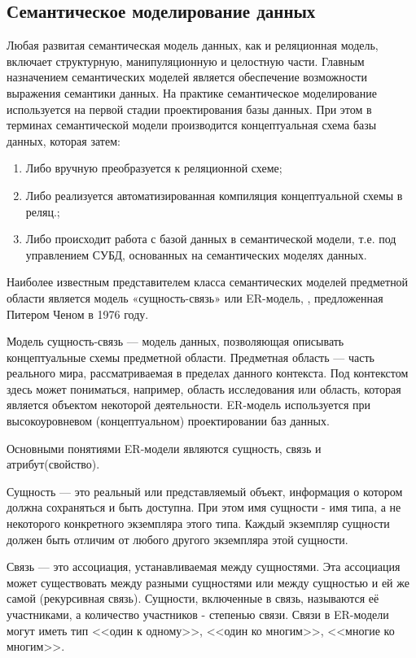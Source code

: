 \newpage

\subsection{Семантическое моделирование данных}

Любая развитая семантическая модель данных, как и реляционная модель, включает структурную, манипуляционную и целостную части. Главным назначением семантических моделей является обеспечение возможности выражения семантики данных. На практике семантическое моделирование используется на первой стадии проектирования базы данных. При этом в терминах семантической модели производится концептуальная схема базы данных, которая затем:
\begin{enumerate}
	\item Либо вручную преобразуется к реляционной схеме;
	\item Либо реализуется автоматизированная компиляция концептуальной схемы в реляц.;
	\item Либо происходит работа с базой данных в семантической модели, т.е. под управлением СУБД, основанных на семантических моделях данных. 
\end{enumerate}

Наиболее известным представителем класса семантических моделей предметной области является модель «сущность-связь» или ER-модель, , предложенная Питером Ченом в 1976 году.

Модель сущность-связь — модель данных, позволяющая описывать концептуальные схемы предметной области. Предметная область — часть реального мира, рассматриваемая в пределах данного контекста. Под контекстом здесь может пониматься, например, область исследования или область, которая является объектом некоторой деятельности. ER-модель используется при высокоуровневом (концептуальном) проектировании баз данных.

Основными понятиями ER-модели являются сущность, связь и атрибут(свойство).

Сущность --- это реальный или представляемый объект, информация о котором должна сохраняться и быть доступна. При этом имя сущности - имя типа, а не некоторого конкретного экземпляра этого типа. Каждый экземпляр сущности должен быть отличим от любого другого экземпляра этой сущности.

Связь --- это ассоциация, устанавливаемая между сущностями. Эта ассоциация может существовать между разными сущностями или между сущностью и ей же самой (рекурсивная связь). Сущности, включенные в связь, называются её участниками, а количество участников - степенью связи. Связи в ER-модели могут иметь тип <<один к одному>>, <<один ко многим>>, <<многие ко многим>>.


